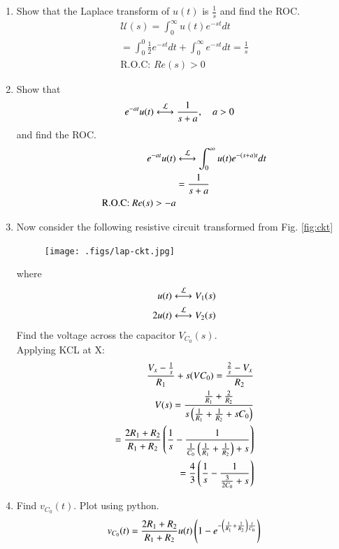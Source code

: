 \documentclass[journal,12pt,twocolumn]{IEEEtran}
\renewcommand\thesection{\arabic{section}}
\begin{document}
\begin{enumerate}[label=\arabic*.,ref=\thesection.\theenumi]
\item Show that the Laplace transform of $u(t)$ is $\frac{1}{s}$ and find the ROC.\\
\solution
\begin{align}
	\mathcal{U}(s) = \int_{0}^{\infty}u(t)e^{-st}dt \\
	= \int_{0}^{0}\frac{1}{2}e^{-st}dt + \int_{0}^{\infty}e^{-st}dt 
	= \frac{1}{s}\\
	\text{R.O.C: } Re(s) > 0
	\label{eq:L-u}
\end{align}
\item Show that 
	\begin{align}
		e^{-at}u(t) &\overset{\mathcal{L}}{\longleftrightarrow} \frac{1}{s+a}, \quad a > 0
	\end{align}
and find the ROC.\\
\solution
\begin{align}
	e^{-at}u(t) &\overset{\mathcal{L}}{\longleftrightarrow} \int_{0}^{\infty}u(t)e^{-(s + a)t}dt \\
	&= \frac{1}{s + a}\\
		\text{R.O.C: } Re(s) > -a
	\label{eq:L-u-shift}
\end{align}
\item Now consider the following resistive circuit transformed from 
Fig. \ref{fig:ckt}
\begin{figure}[!ht]
	\centering
	\texttt{[image: .figs/lap-ckt.jpg]}
	\caption{}
	\label{fig:lap-ckt}
\end{figure}
where 
\begin{align}
	u(t) \overset{\mathcal{L}}{\longleftrightarrow} V_1(s)
	\\
	2u(t) \overset{\mathcal{L}}{\longleftrightarrow} V_2(s)
	\label{eq:V2}
\end{align}
Find the voltage across the capacitor $V_{C_0}(s)$.\\
\solution
Applying KCL at X:
\begin{align}
	\dfrac{V_x - \frac{1}{s}}{R_1} + s(V C_0)= \dfrac{\frac{2}{s} - V_x}{R_2}\\
	V(s) = \frac{\frac{1}{R_1} + \frac{2}{R_2}}{s\left(\frac{1}{R_1} + \frac{1}{R_2} + sC_0\right)} \\
	= \frac{2R_1 + R_2}{R_1 + R_2}\left(\frac{1}{s} - \frac{1}{\frac{1}{C_0}\left(\frac{1}{R_1} + \frac{1}{R_2}\right) + s}\right) \\
	= \frac{4}{3}\left(\frac{1}{s} - \frac{1}{\frac{3}{2C_0} + s}\right)
	\label{eq:V-s}
\end{align}
\item Find $v_{C_0}(t)$.  Plot using python.
\begin{align}
	& v_{C_0}(t) = \frac{2R_1 + R_2}{R_1 + R_2}u(t)\brak{1 - e^{-\brak{\frac{1}{R_1} + \frac{1}{R_2}}\frac{t}{C_0}}} \\

\end{align}
\end{enumerate}
\end{document}
